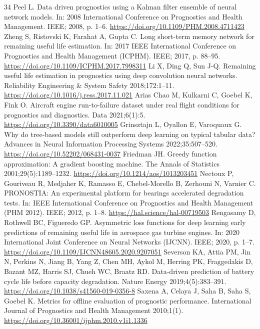 \documentclass[a4paper,fleqn,doubleblind]{cas-dc}
\begin{document}
\begin{thebibliography}{34}
 Peel L. Data driven prognostics using a Kalman filter ensemble of neural network models. In: 2008 International Conference on Prognostics and Health Management. IEEE; 2008, p. 1--6. \url{https://doi.org/10.1109/PHM.2008.4711423}
 Zheng S, Ristovski K, Farahat A, Gupta C. Long short-term memory network for remaining useful life estimation. In: 2017 IEEE International Conference on Prognostics and Health Management (ICPHM). IEEE; 2017, p. 88--95. \url{https://doi.org/10.1109/ICPHM.2017.7998311}
 Li X, Ding Q, Sun J-Q. Remaining useful life estimation in prognostics using deep convolution neural networks. Reliability Engineering \& System Safety 2018;172:1--11. \url{https://doi.org/10.1016/j.ress.2017.11.021}
 Arias Chao M, Kulkarni C, Goebel K, Fink O. Aircraft engine run-to-failure dataset under real flight conditions for prognostics and diagnostics. Data 2021;6(1):5. \url{https://doi.org/10.3390/data6010005}
 Grinsztajn L, Oyallon E, Varoquaux G. Why do tree-based models still outperform deep learning on typical tabular data? Advances in Neural Information Processing Systems 2022;35:507--520. \url{https://doi.org/10.52202/068431-0037}
 Friedman JH. Greedy function approximation: A gradient boosting machine. The Annals of Statistics 2001;29(5):1189--1232. \url{https://doi.org/10.1214/aos/1013203451}
 Nectoux P, Gouriveau R, Medjaher K, Ramasso E, Chebel-Morello B, Zerhouni N, Varnier C. PRONOSTIA: An experimental platform for bearings accelerated degradation tests. In: IEEE International Conference on Prognostics and Health Management (PHM 2012). IEEE; 2012, p. 1--8. \url{https://hal.science/hal-00719503}
 Rengasamy D, Rothwell BC, Figueredo GP. Asymmetric loss functions for deep learning early predictions of remaining useful life in aerospace gas turbine engines. In: 2020 International Joint Conference on Neural Networks (IJCNN). IEEE; 2020, p. 1--7. \url{https://doi.org/10.1109/IJCNN48605.2020.9207051}
 Severson KA, Attia PM, Jin N, Perkins N, Jiang B, Yang Z, Chen MH, Aykol M, Herring PK, Fraggedakis D, Bazant MZ, Harris SJ, Chueh WC, Braatz RD. Data-driven prediction of battery cycle life before capacity degradation. Nature Energy 2019;4(5):383--391. \url{https://doi.org/10.1038/s41560-019-0356-8}
 Saxena A, Celaya J, Saha B, Saha S, Goebel K. Metrics for offline evaluation of prognostic performance. International Journal of Prognostics and Health Management 2010;1(1). \url{https://doi.org/10.36001/ijphm.2010.v1i1.1336}

\end{thebibliography}
\end{document}
